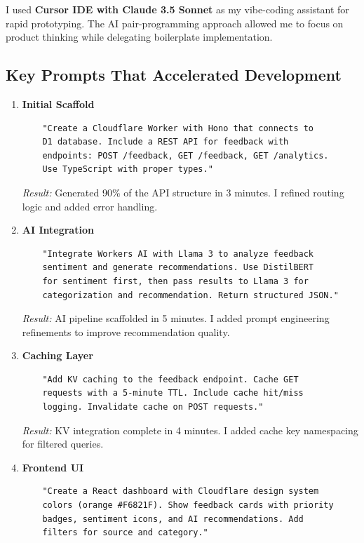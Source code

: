 \documentclass[11pt,a4paper]{article}
\begin{document}
I used \textbf{Cursor IDE with Claude 3.5 Sonnet} as my vibe-coding assistant for rapid prototyping. The AI pair-programming approach allowed me to focus on product thinking while delegating boilerplate implementation.

\subsection{Key Prompts That Accelerated Development}

\begin{enumerate}[leftmargin=*, itemsep=0.8em]
    \item \textbf{Initial Scaffold}
    \begin{verbatim}
    "Create a Cloudflare Worker with Hono that connects to 
    D1 database. Include a REST API for feedback with 
    endpoints: POST /feedback, GET /feedback, GET /analytics.
    Use TypeScript with proper types."
    \end{verbatim}
    
    \textit{Result:} Generated 90\% of the API structure in 3 minutes. I refined routing logic and added error handling.
    
    \item \textbf{AI Integration}
    \begin{verbatim}
    "Integrate Workers AI with Llama 3 to analyze feedback 
    sentiment and generate recommendations. Use DistilBERT 
    for sentiment first, then pass results to Llama 3 for 
    categorization and recommendation. Return structured JSON."
    \end{verbatim}
    
    \textit{Result:} AI pipeline scaffolded in 5 minutes. I added prompt engineering refinements to improve recommendation quality.
    
    \item \textbf{Caching Layer}
    \begin{verbatim}
    "Add KV caching to the feedback endpoint. Cache GET 
    requests with a 5-minute TTL. Include cache hit/miss 
    logging. Invalidate cache on POST requests."
    \end{verbatim}
    
    \textit{Result:} KV integration complete in 4 minutes. I added cache key namespacing for filtered queries.
    
    \item \textbf{Frontend UI}
    \begin{verbatim}
    "Create a React dashboard with Cloudflare design system 
    colors (orange #F6821F). Show feedback cards with priority 
    badges, sentiment icons, and AI recommendations. Add 
    filters for source and category."
    \end{verbatim}
    

\end{enumerate}
\end{document}
